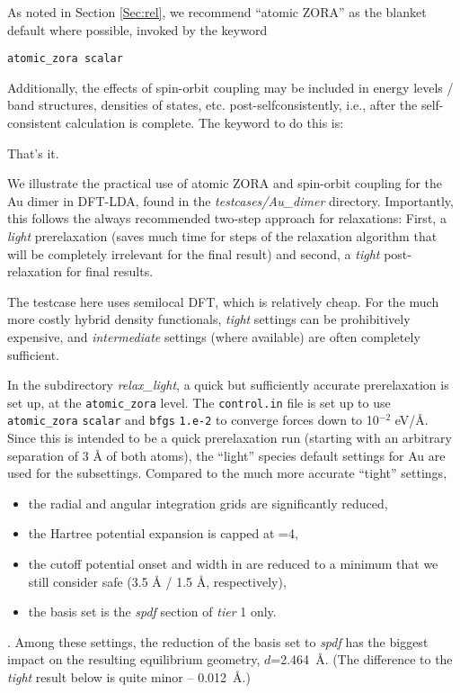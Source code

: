 As noted in Section \ref{Sec:rel}, we recommend ``atomic ZORA'' as the
blanket default where possible, invoked by the keyword

 \texttt{atomic\_zora scalar}

Additionally, the effects of spin-orbit coupling may be included in
energy levels / band structures, densities of states,
etc. post-selfconsistently, i.e., after the self-consistent
calculation is complete. The keyword to do this is:


That's it.

We illustrate the practical use of atomic ZORA and spin-orbit coupling
for the Au dimer in DFT-LDA, found in the \emph{testcases/Au\_dimer} 
directory. Importantly, this follows the always recommended two-step
approach for relaxations: First, a \textit{light} prerelaxation (saves
much time for steps of the relaxation algorithm that will be
completely irrelevant for the final result) and second, a
\textit{tight} post-relaxation for final results.

The testcase here uses semilocal DFT, which is relatively cheap. For
the much more costly hybrid density functionals, 
\textit{tight} settings can be prohibitively expensive, and
\textit{intermediate} settings (where available) are often completely
sufficient. 

In the subdirectory \emph{relax\_light}, a quick but
sufficiently accurate prerelaxation is set up, at the \texttt{atomic\_zora}
level. The \texttt{control.in}
file is set up to use  \texttt{atomic\_zora}
\texttt{scalar} and  \texttt{bfgs}
\texttt{1.e-2} to converge forces down to 10$^{-2}$ eV/{\AA}. Since
this is intended to be a quick prerelaxation run (starting with an
arbitrary separation of 3 {\AA} of both atoms), the ``light'' species 
default settings for Au are used for the 
subsettings. Compared to the much more accurate ``tight'' settings,
\begin{itemize}
\item the radial and angular integration grids are significantly reduced, 
\item the Hartree potential expansion is capped at
  =4,
\item the cutoff potential onset and width in 
  are reduced to a minimum that we still consider safe (3.5 {\AA} / 1.5 {\AA},
  respectively),
\item the basis set is the \emph{spdf} section of \emph{tier} 1 only.
\end{itemize}.
Among these settings, the reduction of the basis set to \emph{spdf} has the
biggest impact on the resulting equilibrium geometry,
$d$=2.464~{\AA}. (The difference to the \textit{tight} result below is
quite minor -- 0.012~{\AA}.) 

